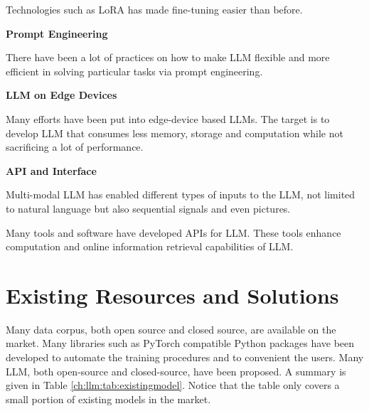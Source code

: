 Technologies such as LoRA has made fine-tuning easier than before.

\vspace{0.1in}
\noindent \textbf{Prompt Engineering}
\vspace{0.1in}

There have been a lot of practices on how to make LLM flexible and more efficient in solving particular tasks via prompt engineering.

\vspace{0.1in}
\noindent \textbf{LLM on Edge Devices}
\vspace{0.1in}

Many efforts have been put into edge-device based LLMs. The target is to develop LLM that consumes less memory, storage and computation while not sacrificing a lot of performance.

\vspace{0.1in}
\noindent \textbf{API and Interface}
\vspace{0.1in}

Multi-modal LLM has enabled different types of inputs to the LLM, not limited to natural language but also sequential signals and even pictures.

Many tools and software have developed APIs for LLM. These tools enhance computation and online information retrieval capabilities of LLM.

\section{Existing Resources and Solutions}

Many data corpus, both open source and closed source, are available on the market. Many libraries such as PyTorch compatible Python packages have been developed to automate the training procedures and to convenient the users. Many LLM, both open-source and closed-source, have been proposed. A summary is given in Table \ref{ch:llm:tab:existingmodel}. Notice that the table only covers a small portion of existing models in the market.

